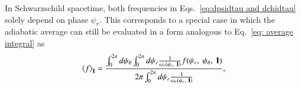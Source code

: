 \documentclass[aps,prx,reprint,superscriptaddress,nofootinbib,longbibliography]{revtex4-1}
\begin{document}
In Schwarzschild spacetime, both frequencies in Eqs.~\eqref{eq:dpsidtau and dchidtau}
solely depend on phase $\psi_{r}$. This corresponds to a special case in which the adiabatic average can still be evaluated in a form analogous to Eq.~\eqref{eq: average integral} as 
\begin{equation}
    \expval{f}_{\mathbf{I}}=\frac{\int_{0}^{2\pi}d\psi_{\theta}\int_{0}^{2\pi}d\psi_{r}\frac{1}{\omega_{r}(\psi_{r},\ \mathbf{I})}f(\psi_{r},\ \psi_{\theta},\ \mathbf{I})}{2\pi\int_{0}^{2\pi}d\psi_{r}\frac{1}{\omega_{r}(\psi_{r},\ \mathbf{I})}},
    \label{eq:average integral1}
\end{equation}
\end{document}
